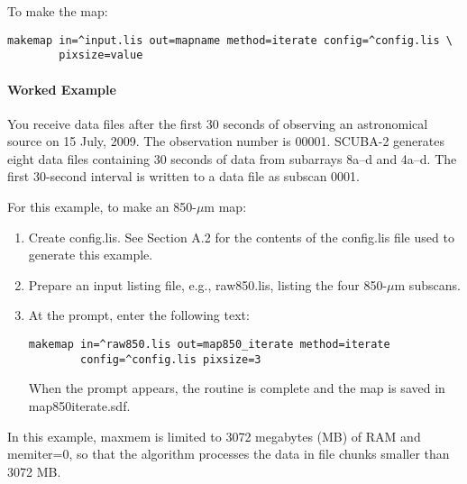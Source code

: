 \documentclass[twoside,11pt]{article}
\renewcommand{\_}{\texttt{\symbol{95}}}
\begin{document}
To make the map:
\begin{verbatim}
makemap in=^input.lis out=mapname method=iterate config=^config.lis \
        pixsize=value
\end{verbatim}

\paragraph{Worked Example\\}

You receive data files after the first 30 seconds of observing an
astronomical source on 15 July, 2009. The observation number is
00001. SCUBA-2 generates eight data files containing 30 seconds of
data from subarrays 8a–d and 4a–d.  The first 30-second interval is
written to a data file as subscan 0001.

For this example, to make an 850-$\mu$m map:
\begin{enumerate}
\item Create config.lis. See Section A.2 for the contents of the
  config.lis file used to generate this example.
\item Prepare an input listing file, e.g., raw850.lis, listing the
  four 850-$\mu$m subscans.
\item At the prompt, enter the following text:
\begin{verbatim}
makemap in=^raw850.lis out=map850_iterate method=iterate
        config=^config.lis pixsize=3
\end{verbatim}
     When the prompt appears, the routine is complete and the map is
     saved in map850\_iterate.sdf.
\end{enumerate}

In this example, maxmem is limited to 3072 megabytes (MB) of RAM and
memiter=0, so that the algorithm processes the data in file chunks
smaller than 3072 MB.
\end{document}
